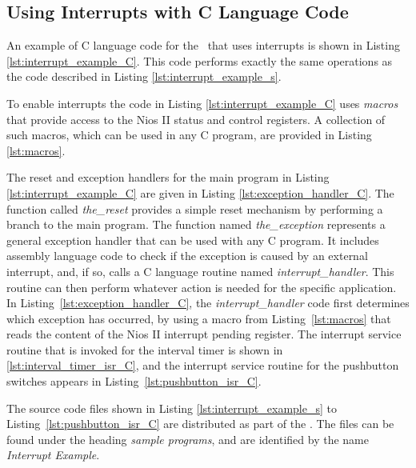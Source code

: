 \subsection{Using Interrupts with C Language Code}

An example of C language code for the \systemName~that uses interrupts is
shown in Listing \ref{lst:interrupt_example_C}. This code performs exactly the same
operations as the code described in Listing \ref{lst:interrupt_example_s}. 

To enable interrupts the code in Listing \ref{lst:interrupt_example_C} uses {\it macros} 
that provide access to the Nios II status 
and control registers.  A collection of such macros, which can be used in any C program,
are provided in Listing \ref{lst:macros}. 

The reset and exception handlers for the main program in Listing \ref{lst:interrupt_example_C} 
are given in Listing \ref{lst:exception_handler_C}. 
The function called {\it the\_reset} provides a simple reset mechanism by
performing a branch to the main program. The function named {\it the\_exception} 
represents a general exception handler that can be used with any C program. It includes 
assembly language code to check if the exception is caused by an external interrupt, and, 
if so, calls a C language routine named {\it interrupt\_handler}. This routine can then 
perform whatever action is needed for the specific application. In 
Listing~\ref{lst:exception_handler_C}, the {\it interrupt\_handler} code first 
determines which exception has occurred, by using a macro from Listing~\ref{lst:macros} 
that reads the content of the Nios II interrupt pending register.  The interrupt service 
routine that is invoked for the interval timer is shown in \ref{lst:interval_timer_isr_C}, 
and the interrupt service routine for the pushbutton switches appears in 
Listing~\ref{lst:pushbutton_isr_C}.

The source code files shown in Listing \ref{lst:interrupt_example_s} to
Listing~\ref{lst:pushbutton_isr_C} are distributed as part of the  
\productNameMed{}. The files can be found under the heading {\it sample programs}, 
and are identified by the name {\it Interrupt Example}.



